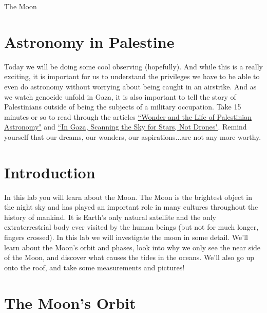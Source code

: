 \documentclass[12pt]{article}%
\begin{document}
\begin{center}
    \LARGE The Moon
\end{center}

\section{Astronomy in Palestine}
Today we will be doing some cool observing (hopefully). And while this is a really exciting, it is important
for us to understand the privileges we have to be able to even do astronomy without worrying
about being caught in an airstrike. And as we watch genocide unfold in Gaza, it is also
important to tell the story of Palestinians outside of being the subjects of a military occupation. 
Take 15 minutes or so to read through the articles \href{https://magazine.scienceforthepeople.org/vol23-1/wonder-and-the-life-of-palestinian-astronomy/}{``Wonder and the Life of Palestinian Astronomy"} and \href{https://undark.org/2020/03/02/gaza-astronomy/}{``In Gaza, Scanning the Sky for Stars, Not Drones"}. Remind yourself that our dreams, our wonders, our aspirations...are not any more worthy.

\section{Introduction}
In this lab you will learn about the Moon. 
The Moon is the brightest object in the night sky and has played an important role in many cultures throughout the history of mankind. 
It is Earth's only natural satellite and the only extraterrestrial body ever visited by the human beings (but not for much longer, fingers crossed).
In this lab we will investigate the moon in some detail. 
We'll learn about the Moon's orbit and phases, look into why we only see the near side of the Moon, and discover what causes the tides in the oceans. 
We'll also go up onto the roof, and take some measurements and pictures! 


\section{The Moon's Orbit}
\end{document}
